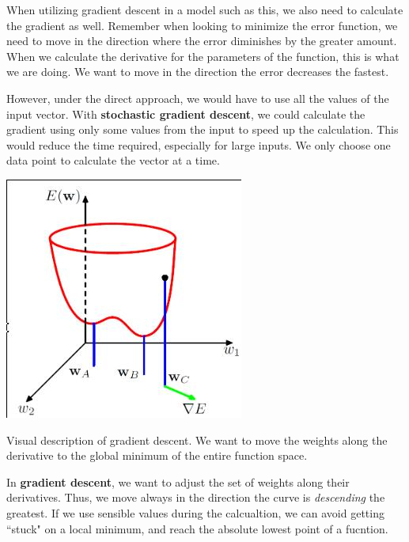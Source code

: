 \documentclass{tufte-handout}
\begin{document}
When utilizing gradient descent in a model such as this, we also need to calculate the gradient 
as well. Remember when looking to minimize the error function, we need to move in the direction 
where the error diminishes by the greater amount. When we calculate the derivative for the
parameters of the function, this is what we are doing. We want to move in the direction the 
error decreases the fastest.

However, under the direct approach, we would have to use all the values of the input vector. 
With \textbf{stochastic gradient descent}, we could calculate the gradient using only some values
from the input to speed up the calculation.  This would reduce the time required, especially for
large inputs. We only choose one data point to calculate the vector at a time.

\begin{marginfigure}
	\includegraphics[scale=0.4]{gradient_descent}
	\caption{Visual description of gradient descent. We want to move 
		the weights along the derivative to the global minimum of the
		entire function space.}
\end{marginfigure}

In \textbf{gradient descent}, we want to adjust the set of weights along their derivatives. Thus,
we move always in the direction the curve is \textit{descending} the greatest. If we use sensible 
values during the calcualtion, we can avoid getting ``stuck" on a local minimum, and reach the 
absolute lowest point of a fucntion.
\end{document}
